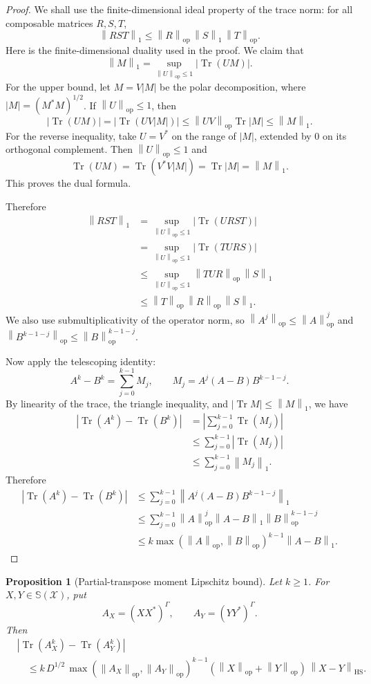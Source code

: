 \documentclass[11pt,oneside]{book}
\newtheorem{proposition}[theorem]{Proposition}
\DeclareMathOperator{\Tr}{Tr}
\newcommand{\1}{\mathbf 1}
\newcommand{\Sphere}{\mathbb S}
\newcommand{\pt}{\Gamma}
\newcommand{\HS}{\mathrm{HS}}
\newcommand{\op}{\mathrm{op}}
\newcommand{\norm}[1]{\left\|#1\right\|}
\begin{document}
\begin{proof}
We shall use the finite-dimensional ideal property of the trace norm:
for all composable matrices \(R,S,T\),
\[
  \norm{RST}_1\le \norm R_{\op}\,\norm S_1\,\norm T_{\op}.
\]
Here is the finite-dimensional duality used in the proof.  We claim that
\[
  \norm M_1=\sup_{\norm U_{\op}\le1}|\Tr(UM)|.
\]
For the upper bound, let \(M=V|M|\) be the polar decomposition, where
\(|M|=(M^*M)^{1/2}\).  If \(\norm U_{\op}\le1\), then
\[
  |\Tr(UM)|
  =
  |\Tr(UV|M|)|
  \le
  \norm{UV}_{\op}\Tr|M|
  \le
  \norm M_1.
\]
For the reverse inequality, take \(U=V^*\) on the range of \(|M|\), extended
by \(0\) on its orthogonal complement.  Then \(\norm U_{\op}\le1\) and
\[
  \Tr(UM)=\Tr(V^*V|M|)=\Tr|M|=\norm M_1.
\]
This proves the dual formula.

Therefore
\[
\begin{aligned}
  \norm{RST}_1
  &=
  \sup_{\norm U_{\op}\le1}|\Tr(URST)|  \\
  &=
  \sup_{\norm U_{\op}\le1}|\Tr(TURS)|  \\
  &\le
  \sup_{\norm U_{\op}\le1}\norm{TUR}_{\op}\,\norm S_1 \\
  &\le
  \norm T_{\op}\,\norm R_{\op}\,\norm S_1 .
\end{aligned}
\]
We also use submultiplicativity of the operator norm, so
\(\norm{A^j}_{\op}\le\norm A_{\op}^j\) and
\(\norm{B^{k-1-j}}_{\op}\le\norm B_{\op}^{k-1-j}\).

Now apply the telescoping identity:
\[
  A^k-B^k=\sum_{j=0}^{k-1}M_j,
  \qquad
  M_j=A^j(A-B)B^{k-1-j}.
\]
By linearity of the trace, the triangle inequality, and
\(|\Tr M|\le\norm M_1\), we have
\[
\begin{aligned}
|\Tr(A^k)-\Tr(B^k)|
&=
\left|\sum_{j=0}^{k-1}\Tr(M_j)\right|\\
&\le
\sum_{j=0}^{k-1}|\Tr(M_j)|\\
&\le
\sum_{j=0}^{k-1}\norm{M_j}_1.
\end{aligned}
\]
Therefore
\[
\begin{aligned}
|\Tr(A^k)-\Tr(B^k)|
&\le \sum_{j=0}^{k-1}
  \norm{A^j(A-B)B^{k-1-j}}_1\\
&\le \sum_{j=0}^{k-1}
  \norm A_{\op}^j\norm{A-B}_1\norm B_{\op}^{k-1-j}\\
&\le k\max(\norm A_{\op},\norm B_{\op})^{k-1}\norm{A-B}_1.
\end{aligned}
\]
\end{proof}

\begin{proposition}[Partial-transpose moment Lipschitz bound]
Let \(k\ge1\).  For \(X,Y\in\Sphere(\mathcal X)\), put
\[
  A_X=(XX^*)^\pt,\qquad A_Y=(YY^*)^\pt .
\]
Then
\[
\begin{aligned}
&|\Tr(A_X^k)-\Tr(A_Y^k)|\\
&\quad\le
  k\,D^{1/2}\,
  \max(\norm{A_X}_{\op},\norm{A_Y}_{\op})^{k-1}
  (\norm X_{\op}+\norm Y_{\op})\,\norm{X-Y}_{\HS}.
\end{aligned}
\]
\end{proposition}
\end{document}
